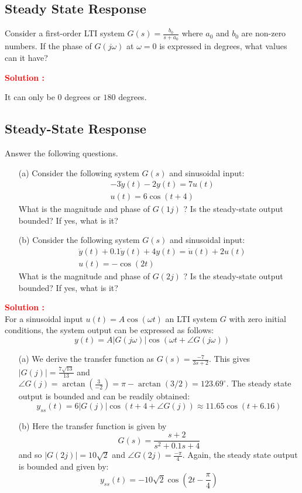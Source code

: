 \documentclass[12pt]{article}
\begin{document}
\clearpage
\subsection{Steady State Response}

Consider a first-order LTI system \(G(s) = \frac{b_0}{s+a_0} \) where \(a_0\) and \(b_0\) are non-zero numbers. If the phase of \(G(j\omega)\) at \(\omega = 0\) is expressed in degrees, what values can it have?

\textbf{\textcolor{red}{Solution :}}

It can only be \(0\) degrees or \(180\) degrees.

\clearpage
\subsection{Steady-State Response}

Answer the following questions.
\begin{itemize}
    \item [(a)] Consider the following system $G(s)$ and sinusoidal input:
        \begin{align*}
        & -3 \dot{y}(t)-2 y(t)=7 u(t) \\
        & u(t)=6 \cos (t+4)
        \end{align*}
    What is the magnitude and phase of $G(1 j)$ ? Is the steady-state output bounded? If yes, what is it?
    \item[(b)] Consider the following system $G(s)$ and sinusoidal input:
        \begin{align*}
        & \ddot{y}(t)+0.1 \dot{y}(t)+4 y(t)=\dot{u}(t)+2 u(t) \\
        & u(t)=-\cos (2 t)
        \end{align*}
    What is the magnitude and phase of $G(2 j)$ ? Is the steady-state output bounded? If yes, what is it?
\end{itemize}

\textbf{\textcolor{red}{Solution :}} \\
For a sinusoidal input $u(t)=A \cos (\omega t)$ an LTI system $G$ with zero initial conditions, the system output can be expressed as follows:
$$
y(t)=A|G(j \omega)| \cos (\omega t+\angle G(j \omega))
$$
\begin{itemize}
    \item [(a)]  We derive the transfer function as $G(s)=\frac{-7}{3 s+2}$. This gives $|G(j)|=\frac{7 \sqrt{13}}{13}$ and $\angle G(j)=\arctan \left(\frac{3}{-2}\right)=\pi-\arctan (3 / 2)=123.69^{\circ}$. The steady state output is bounded and can be readily obtained:
$$
y_{s s}(t)=6|G(j)| \cos (t+4+\angle G(j)) \approx 11.65 \cos (t+6.16)
$$
    \item [(b)] Here the transfer function is given by
        $$ G(s)=\frac{s+2}{s^2+0.1s+4} $$
and so $|G(2j)| = 10 \sqrt{2}$ and $\angle G(2j) = \frac{-\pi}{4}$. Again, the steady state output is bounded and given by:
$$y_{ss}(t)=-10\sqrt{2}\cos{\left( 2 t -\frac{\pi}{4} \right)}$$
\end{itemize}
\end{document}
